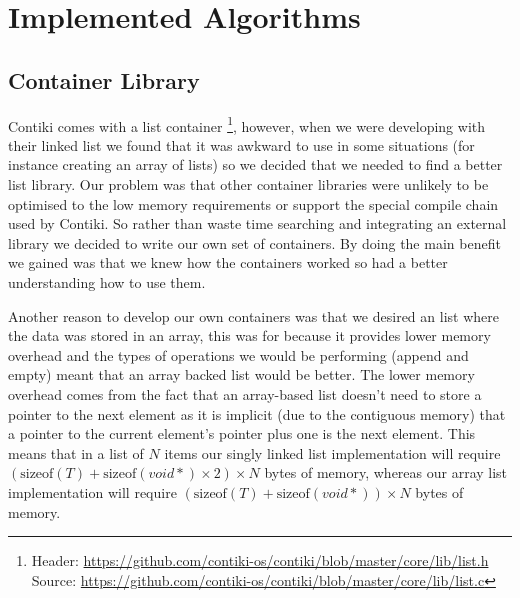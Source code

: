 \section{Implemented Algorithms}


\subsection{Container Library}

Contiki comes with a list container \footnote{Header: \url{https://github.com/contiki-os/contiki/blob/master/core/lib/list.h} Source: \url{https://github.com/contiki-os/contiki/blob/master/core/lib/list.c}}, however, when we were developing with their linked list we found that it was awkward to use in some situations (for instance creating an array of lists) so we decided that we needed to find a better list library. Our problem was that other container libraries were unlikely to be optimised to the low memory requirements or support the special compile chain used by Contiki. So rather than waste time searching and integrating an external library we decided to write our own set of containers. By doing the main benefit we gained was that we knew how the containers worked so had a better understanding how to use them.

Another reason to develop our own containers was that we desired an list where the data was stored in an array, this was for because it provides lower memory overhead and the types of operations we would be performing (append and empty) meant that an array backed list would be better. The lower memory overhead comes from the fact that an array-based list doesn't need to store a pointer to the next element as it is implicit (due to the contiguous memory) that a pointer to the current element's pointer plus one is the next element. This means that in a list of $N$ items our singly linked list implementation will require $(\text{sizeof}(T) + \text{sizeof}(void *) \times 2) \times N$ bytes of memory, whereas our array list implementation will require $(\text{sizeof}(T) + \text{sizeof}(void *)) \times N$ bytes of memory.

